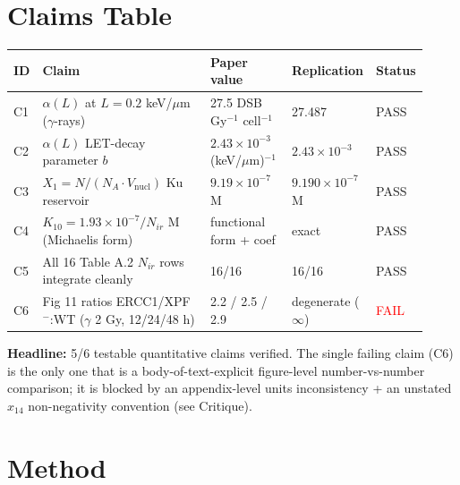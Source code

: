 \documentclass[11pt]{article}
\begin{document}
\section*{Claims Table}

\begin{longtable}{@{}p{0.06\linewidth}p{0.42\linewidth}p{0.20\linewidth}p{0.14\linewidth}p{0.10\linewidth}@{}}
\toprule
\textbf{ID} & \textbf{Claim} & \textbf{Paper value} & \textbf{Replication} & \textbf{Status} \\
\midrule
\endhead
C1 & $\alpha(L)$ at $L=0.2$ keV/$\mu$m ($\gamma$-rays) & 27.5 DSB Gy$^{-1}$ cell$^{-1}$ & 27.487 & \textcolor{green!60!black}{PASS} \\
C2 & $\alpha(L)$ LET-decay parameter $b$ & $2.43\times10^{-3}$ (keV/$\mu$m)$^{-1}$ & $2.43\times10^{-3}$ & \textcolor{green!60!black}{PASS} \\
C3 & $X_1=N/(N_A\cdot V_{\mathrm{nucl}})$ Ku reservoir & $9.19\times10^{-7}$ M & $9.190\times10^{-7}$ M & \textcolor{green!60!black}{PASS} \\
C4 & $K_{10}=1.93\times10^{-7}/N_{ir}$ M (Michaelis form) & functional form + coef & exact & \textcolor{green!60!black}{PASS} \\
C5 & All 16 Table A.2 $N_{ir}$ rows integrate cleanly & 16/16 & 16/16 & \textcolor{green!60!black}{PASS} \\
C6 & Fig 11 ratios ERCC1/XPF$^-$:WT ($\gamma$ 2 Gy, 12/24/48 h) & 2.2 / 2.5 / 2.9 & degenerate ($\infty$) & \textcolor{red}{FAIL} \\
\bottomrule
\end{longtable}

\textbf{Headline:} 5/6 testable quantitative claims verified. The single failing
claim (C6) is the only one that is a body-of-text-explicit figure-level number-vs-number
comparison; it is blocked by an appendix-level units inconsistency + an unstated
$x_{14}$ non-negativity convention (see Critique).

\section*{Method}
\end{document}
